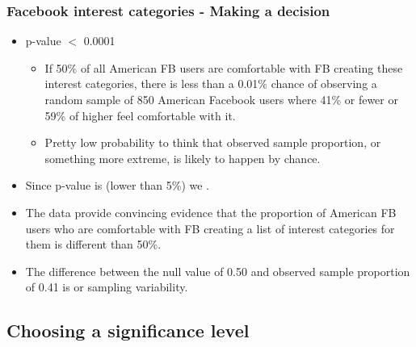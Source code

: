 \documentclass[t,compress,mathserif]{beamer}
\begin{document}
\begin{frame}
\frametitle{Facebook interest categories - Making a decision}

\begin{itemize}

\item p-value $<$ 0.0001

\pause

\begin{itemize}
\item If 50\% of all American FB users are comfortable with FB creating these interest categories, there is less than a 0.01\% chance of observing a random sample of 850 American Facebook users where 41\% or fewer or 59\% of higher feel comfortable with it.
\pause
\item Pretty low probability to think that observed sample proportion, or something more extreme, is likely to happen by chance.
\end{itemize}

\pause
\item Since p-value is  (lower than 5\%) we .

\pause
\item The data provide convincing evidence that the proportion of American FB users who are comfortable with FB creating a list of interest categories for them is different than 50\%.

\pause
\item The difference between the null value of 0.50 and observed sample proportion of 0.41 is  or sampling variability.

\end{itemize}

\end{frame}


\subsection{Choosing a significance level}

\end{document}
